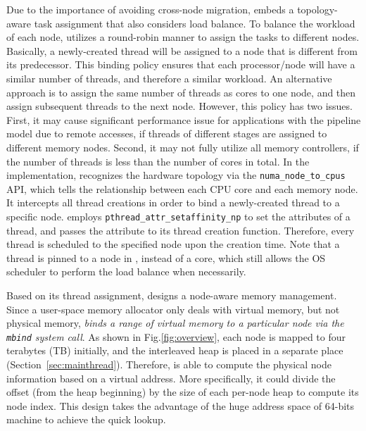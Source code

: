 Due to the importance of avoiding cross-node migration, \NA{} embeds a topology-aware task assignment that also considers load balance.
To balance the workload of each node, \NA{} utilizes a round-robin manner to assign the tasks to different nodes. Basically, a newly-created thread will be assigned to a node that is different from its predecessor. This binding policy ensures that each processor/node will have a similar number of threads, and therefore a similar workload. An alternative approach is to assign the same number of threads as cores to one node, and then assign subsequent threads to the next node. However, this policy has two issues. First, it may cause significant performance issue for applications with the pipeline model due to remote accesses, if threads of different stages are assigned to different memory nodes. Second, it may not fully utilize all memory controllers, if the number of threads is less than the number of cores in total.   In the implementation, \NA{} recognizes the hardware topology via the \texttt{numa\_node\_to\_cpus} API, which tells the relationship between each CPU core and each memory node. It intercepts all thread creations in order to bind a newly-created thread to a specific node. \NA{} employs \texttt{pthread\_attr\_setaffinity\_np} to set the attributes of a thread, and passes the attribute to its thread creation function. Therefore, every thread is scheduled to the specified node upon the creation time. Note that a thread is pinned to a node in \NM{}, instead of a core, which still allows the OS scheduler to perform the load balance when necessarily. 

Based on its thread assignment, \NA{} designs a node-aware memory management. Since a user-space memory allocator only deals with virtual memory, but not physical memory, \textit{\NA{} binds a range of virtual memory to a particular node via the \texttt{mbind} system call}. As shown in Fig.\ref{fig:overview}, each node is mapped to four terabytes (TB) initially, and the interleaved heap is placed in a separate place (Section~\ref{sec:mainthread}).  Therefore, \NA{} is able to compute the physical node information based on a virtual address. More specifically, it could divide the offset (from the heap beginning) by the size of each per-node heap to compute its node index. This design takes the advantage of the huge address space of 64-bits machine to achieve the quick lookup.

